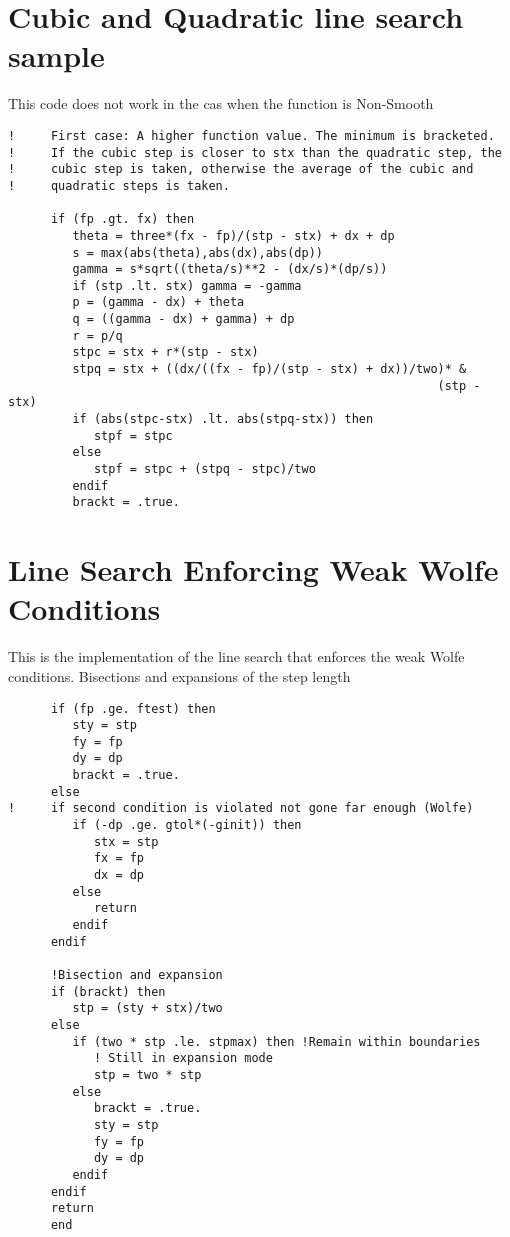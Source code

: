 \section{Cubic and Quadratic line search sample}
This code does not work in the cas when the function is Non-Smooth \label{nsnowork}
\lstset{
  firstnumber = 3881
}

\begin{lstlisting}
!     First case: A higher function value. The minimum is bracketed. 
!     If the cubic step is closer to stx than the quadratic step, the 
!     cubic step is taken, otherwise the average of the cubic and 
!     quadratic steps is taken.
      
      if (fp .gt. fx) then
         theta = three*(fx - fp)/(stp - stx) + dx + dp
         s = max(abs(theta),abs(dx),abs(dp))
         gamma = s*sqrt((theta/s)**2 - (dx/s)*(dp/s))
         if (stp .lt. stx) gamma = -gamma
         p = (gamma - dx) + theta
         q = ((gamma - dx) + gamma) + dp
         r = p/q
         stpc = stx + r*(stp - stx)
         stpq = stx + ((dx/((fx - fp)/(stp - stx) + dx))/two)* &
                                                            (stp - stx)
         if (abs(stpc-stx) .lt. abs(stpq-stx)) then
            stpf = stpc
         else
            stpf = stpc + (stpq - stpc)/two
         endif
         brackt = .true.
\end{lstlisting}

\section{Line Search Enforcing Weak Wolfe Conditions}
This is the implementation of the line search that enforces the weak Wolfe conditions. Bisections and expansions of the step length \label{linesww}
\lstset{
  firstnumber = 4425
}

\begin{lstlisting}
      if (fp .ge. ftest) then 
         sty = stp
         fy = fp
         dy = dp
         brackt = .true.
      else
!     if second condition is violated not gone far enough (Wolfe)
         if (-dp .ge. gtol*(-ginit)) then
            stx = stp
            fx = fp
            dx = dp
         else
            return
         endif
      endif   
      
      !Bisection and expansion
      if (brackt) then
         stp = (sty + stx)/two
      else
         if (two * stp .le. stpmax) then !Remain within boundaries
            ! Still in expansion mode
            stp = two * stp
         else
            brackt = .true.
            sty = stp
            fy = fp
            dy = dp
         endif
      endif
      return
      end
\end{lstlisting}
